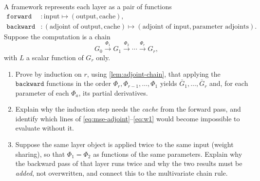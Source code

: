 \begin{exercise}\label{ex:ml-8}
A framework represents each layer as a pair of functions
\[
  \begin{aligned}
    \texttt{forward}&\colon \text{input}\mapsto(\text{output},\text{cache}),\\
    \texttt{backward}&\colon(\text{adjoint of output},\text{cache})\mapsto
      (\text{adjoint of input},\text{parameter adjoints}).
  \end{aligned}
\]
Suppose the computation is a chain
\[
  G_0\xrightarrow{\Phi_1}G_1\xrightarrow{\Phi_2}\cdots
  \xrightarrow{\Phi_r}G_r,
\]
with $L$ a scalar function of $G_r$ only.
\begin{enumerate}[label=(\alph*)]
  \item Prove by induction on $r$, using \cref{lem:adjoint-chain}, that applying
    the $\texttt{backward}$ functions in the order $\Phi_r,\Phi_{r-1},\ldots,\Phi_1$
    yields $\bar G_1,\ldots,\bar G_r$ and, for each parameter of each $\Phi_a$,
    its partial derivatives.
  \item Explain why the induction step needs the \emph{cache} from the forward
    pass, and identify which lines of
    \eqref{eq:mse-adjoint}--\eqref{eq:w1} would become impossible to evaluate
    without it.
  \item Suppose the same layer object is applied twice to the same input (weight
    sharing), so that $\Phi_1=\Phi_2$ as functions of the same parameters.
    Explain why the backward pass of that layer runs twice and why the two
    results must be \emph{added}, not overwritten, and connect this to the
    multivariate chain rule.
\end{enumerate}
\end{exercise}
